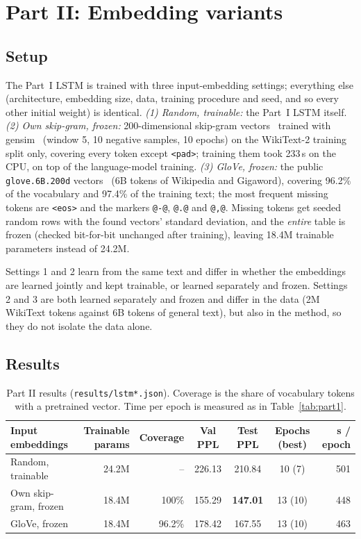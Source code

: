 \documentclass[10pt]{article}
\newcommand{\tok}[1]{\texttt{#1}}
\begin{document}
\section{Part II: Embedding variants}

\subsection{Setup}

The Part~I LSTM is trained with three input-embedding settings; everything else (architecture, embedding size, data, training procedure and seed, and so every other initial weight) is identical. \emph{(1) Random, trainable:} the Part~I LSTM itself. \emph{(2) Own skip-gram, frozen:} 200-dimensional skip-gram vectors~\cite{mikolov2013} trained with gensim~\cite{rehurek2010} (window 5, 10 negative samples, 10 epochs) on the WikiText-2 training split only, covering every token except \tok{<pad>}; training them took 233\,s on the CPU, on top of the language-model training. \emph{(3) GloVe, frozen:} the public \tok{glove.6B.200d} vectors~\cite{pennington2014} (6B tokens of Wikipedia and Gigaword), covering 96.2\% of the vocabulary and 97.4\% of the training text; the most frequent missing tokens are \tok{<eos>} and the markers \tok{@-@}, \tok{@.@} and \tok{@,@}. Missing tokens get seeded random rows with the found vectors' standard deviation, and the \emph{entire} table is frozen (checked bit-for-bit unchanged after training), leaving 18.4M trainable parameters instead of 24.2M.

Settings 1 and 2 learn from the same text and differ in whether the embeddings are learned jointly and kept trainable, or learned separately and frozen. Settings 2 and 3 are both learned separately and frozen and differ in the data (2M WikiText tokens against 6B tokens of general text), but also in the method, so they do not isolate the data alone.

\subsection{Results}

\begin{table}[h]
\centering\footnotesize\setlength{\tabcolsep}{4pt}
\begin{tabular}{lrrcccr}
\toprule
Input embeddings & Trainable params & Coverage & Val PPL & Test PPL & Epochs (best) & s / epoch \\
\midrule
Random, trainable & 24.2M & -- & 226.13 & 210.84 & 10 (7) & 501 \\
Own skip-gram, frozen & 18.4M & 100\% & 155.29 & \textbf{147.01} & 13 (10) & 448 \\
GloVe, frozen & 18.4M & 96.2\% & 178.42 & 167.55 & 13 (10) & 463 \\
\bottomrule
\end{tabular}
\caption{Part II results (\tok{results/lstm*.json}). Coverage is the share of vocabulary tokens with a pretrained vector. Time per epoch is measured as in Table~\ref{tab:part1}.}
\label{tab:part2}
\end{table}
\end{document}
